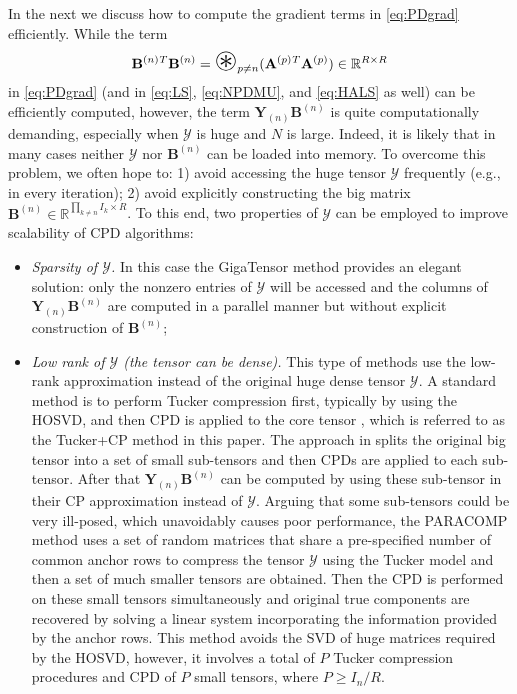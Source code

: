 \documentclass[10pt,twocolumn,twoside]{IEEEtran}
\newcommand{\tensor}[1]{\ensuremath{\boldsymbol{\mathscr{#1}}}}
\newcommand{\tenmat}[2][n]{\ensuremath{{\mathbf{#2}}_{(#1)}}}
\newcommand{\matn}[2][n]{\ensuremath{\mathbf{#2}^{(#1)}}}
\newcommand{\Real}{\ensuremath{\mathbb{R}}}
\DeclareMathOperator*{\bighdp}{\mathlarger{\mathlarger{\mathlarger{\mathlarger{\circledast}}}}}     \DeclareMathOperator*{\tentimes}{{\times}}
\begin{document}
In the next we discuss how to compute the gradient terms in \eqref{eq:PDgrad} efficiently. While the term 
\begin{equation}
\label{eq:cpgradBtB}
\matn{B}{}^T\matn{B}=\bighdp\nolimits_{p\neq n}(\matn[p]{A}{}^T\matn[p]{A})\in\Real^{R\times R}
\end{equation}
in \eqref{eq:PDgrad} (and in \eqref{eq:LS}, \eqref{eq:NPDMU}, and \eqref{eq:HALS} as well)  can be efficiently computed, however, the term $\tenmat{Y}\matn{B}$ is quite computationally demanding, especially when \tensor{Y} is huge and $N$ is large. Indeed, it is likely that in many cases neither \tensor{Y} nor \matn{B} can be loaded into memory. To overcome this problem, we often hope to: 1) avoid accessing the huge tensor \tensor{Y} frequently (e.g., in every iteration); 2) avoid explicitly constructing the big matrix $\matn{B}\in\Real^{\prod_{k\neq n}I_k\times R}$. To this end, two properties of \tensor{Y} can be employed to improve scalability of CPD algorithms:
\begin{itemize}
\item
\emph{Sparsity of \tensor{Y}.} In this case the GigaTensor method \cite{GigaTensor} provides an elegant solution: only the nonzero entries of \tensor{Y} will be accessed and the columns of $\tenmat{Y}\matn{B}$ are computed in a parallel manner but without explicit construction of \matn{B};

\item
\emph{Low rank of \tensor{Y} (the tensor can be dense).  }  This type of methods use the low-rank approximation instead of the original huge dense tensor \tensor{Y}.  A standard method is to perform Tucker compression first,  typically by using the HOSVD, and then CPD is applied to the core tensor \cite{BroTuckerPD}, which is referred to as the Tucker+CP method in this paper. The approach in \cite{gridPARAFAC} splits the original big tensor into a set of small sub-tensors and then CPDs are applied to each sub-tensor. After that $\tenmat{Y}\matn{B}$ can be computed by using these sub-tensor in their CP approximation instead of \tensor{Y}. Arguing that some sub-tensors could be very ill-posed, which unavoidably causes poor performance, the PARACOMP method \cite{spm2014_paracomp} uses a set of random matrices that share a pre-specified number of common anchor rows to compress the tensor \tensor{Y} using the Tucker model and then a set of much smaller tensors are obtained. Then the CPD is performed on these small tensors simultaneously and original true components are recovered by solving a linear system incorporating the information provided by the anchor rows. This method avoids the SVD of huge matrices required by the HOSVD, however, it involves a total of $P$  Tucker compression procedures and CPD of $P$ small tensors, where  $P\ge {I_n}/{R}$.
\end{itemize}
\end{document}
